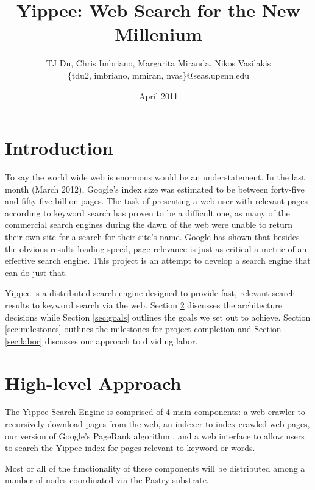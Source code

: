 \documentclass[11pt, letterpaper, oneside, twocolumn]{article}
\begin{document}
\title{Yippee: Web Search for the New Millenium}
\author{	TJ Du, Chris Imbriano, Margarita Miranda, Nikos Vasilakis\\
\{tdu2, imbriano, mmiran, nvas\}@seas.upenn.edu}
\date{April 2011}

\maketitle

\section{ Introduction }

To say the world wide web is enormous would be an understatement.  In the last month (March 2012),  Google's index size was estimated to be between forty-five and fifty-five billion pages.\cite{websize} The task of presenting a web user with relevant pages according to keyword search has proven to be a difficult one, as many of the commercial search engines during the dawn of the web were unable to return their own site for a search for their site's name.\cite{google} Google has shown that besides the obvious results loading speed, page relevance is just as critical a metric of an effective search engine. This project is an attempt to develop a search engine that can do just that.

Yippee is a distributed search engine designed to provide fast, relevant search results to keyword search via the web.  Section \ref{sec:approach} discusses the architecture decisions while Section \ref{sec:goals}  outlines the goals we set out to achieve.  Section \ref{sec:milestones} outlines the milestones for project completion and Section \ref{sec:labor} discusses our approach to dividing labor.


\section{ High-level Approach }
\label{sec:approach}

The Yippee Search Engine is comprised of 4 main components: a web crawler to recursively download pages from the web, an indexer to index crawled web pages, our version of Google's PageRank algorithm \cite{pagerank}, and a web interface to allow users to search the Yippee index for pages relevant to keyword or words.

Most or all of the functionality of these components will be distributed among a number of nodes coordinated via the Pastry substrate. 
\end{document}
